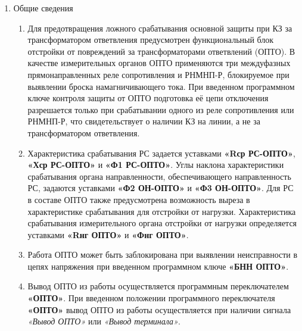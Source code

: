 \color{black}

\begin{enumerate}[label=\arabic{section}.\arabic{subsection}.\arabic{enumi}, labelsep=4pt, leftmargin=0pt, itemindent=57pt, itemsep=0pt, parsep=5pt] %

\item Общие сведения

\begin{enumerate}[label=\arabic{section}.\arabic{subsection}.\arabic{enumi}.\arabic*, labelsep=4pt, leftmargin=0em, itemindent=65pt, parsep=0pt]

\item
Для предотвращения ложного срабатывания основной защиты при КЗ за трансформатором ответвления предусмотрен функциональный блок отстройки от повреждений за трансформаторами ответвлений (ОПТО).
В качестве измерительных органов ОПТО применяются три междуфазных прямонаправленных реле сопротивления и РНМНП-Р, блокируемое при выявлении броска намагничивающего тока.
При введенном программном ключе контроля защиты от ОПТО подготовка её цепи отключения разрешается только при срабатывании одного из реле сопротивления или РНМНП-Р, что свидетельствует о наличии КЗ на линии, а не за трансформатором ответвления.

\item
Характеристика срабатывания РС задается уставками \textbf{«Rср РС-ОПТО»}, \textbf{«Хср РС-ОПТО»} и \textbf{«Ф1 РС-ОПТО»}.
Углы наклона характеристики срабатывания органа направленности, обеспечивающего направленность РС, задаются уставками \textbf{«Ф2 ОН-ОПТО»} и \textbf{«Ф3 ОН-ОПТО»}.
Для РС в составе ОПТО также предусмотрена возможность выреза в характеристике срабатывания для отстройки от нагрузки.
Характеристика срабатывания измерительного органа отстройки от нагрузки определяется уставками \textbf{«Rнг ОПТО»} и \textbf{«Фнг ОПТО»}.

\item
Работа ОПТО может быть заблокирована при выявлении неисправности в цепях напряжения при введенном программном ключе \textbf{«БНН ОПТО»}.

\item
Вывод ОПТО из работы осуществляется программным переключателем \textbf{«ОПТО»}.
При введенном положении программного переключателя \textbf{«ОПТО»} вывод ОПТО из работы осуществляется при наличии сигнала \textit{«Вывод ОПТО»} или \textit{«Вывод терминала»}. 


\end{enumerate}
\end{enumerate}
